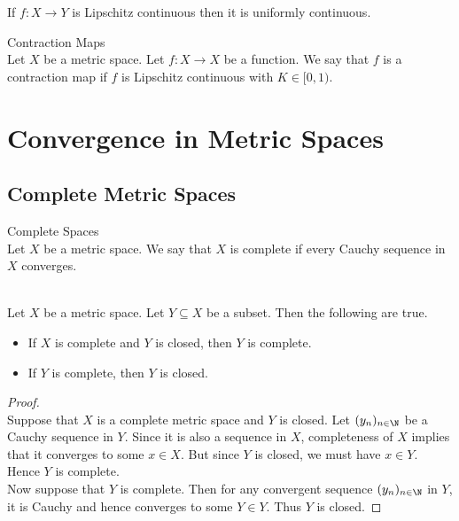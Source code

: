 \documentclass[a4paper]{article}
\begin{document}
\begin{lmm}{}{} If $f:X\to Y$ is Lipschitz continuous then it is uniformly continuous. 
\end{lmm}

\begin{defn}{Contraction Maps}{}\\
Let $X$ be a metric space. Let $f:X\to X$ be a function. We say that $f$ is a contraction map if $f$ is Lipschitz continuous with $K\in[0,1)$. 
\end{defn}

\pagebreak
\section{Convergence in Metric Spaces}
\subsection{Complete Metric Spaces}
\begin{defn}{Complete Spaces}{}\\
Let $X$ be a metric space. We say that $X$ is complete if every Cauchy sequence in $X$ converges. 
\end{defn}

\begin{prp}{}{}\\
Let $X$ be a metric space. Let $Y\subseteq X$ be a subset. Then the following are true. 
\begin{itemize}
\item If $X$ is complete and $Y$ is closed, then $Y$ is complete. 
\item If $Y$ is complete, then $Y$ is closed. 
\end{itemize}
\begin{proof}\\
Suppose that $X$ is a complete metric space and $Y$ is closed. Let $(y_n)_{n\in\N}$ be a Cauchy sequence in $Y$. Since it is also a sequence in $X$, completeness of $X$ implies that it converges to some $x\in X$. But since $Y$ is closed, we must have $x\in Y$. Hence $Y$ is complete. \\

Now suppose that $Y$ is complete. Then for any convergent sequence $(y_n)_{n\in\N}$ in $Y$, it is Cauchy and hence converges to some $Y\in Y$. Thus $Y$ is closed. 
\end{proof}
\end{prp}
\end{document}
